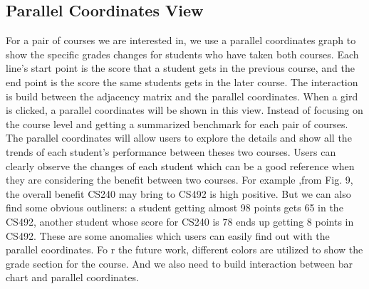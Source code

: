 \subsection{Parallel Coordinates View}
\label{sec:parallel}
For a pair of courses we are interested in,  we use a parallel coordinates graph to show the specific grades changes for students who have taken both courses. Each line’s start point is the score that a student gets in the previous course, and the end point is the score the same students gets in the later course. The interaction is build between the adjacency matrix and the parallel coordinates. When a gird is clicked, a parallel coordinates will be shown in this view. Instead of focusing on the course level and getting a summarized benchmark  for each pair of courses. The parallel coordinates will allow users to explore the details and show all the trends of each student’s performance between theses two courses. Users can clearly observe the changes of each student which can be  a good reference when they are considering the benefit between two courses. For example ,from Fig. 9, the overall benefit CS240 may bring to CS492 is high positive. But we can also find some obvious outliners: a student getting almost 98 points gets 65 in the CS492, another student whose score for CS240 is 78 ends up getting 8 points in CS492. These are some anomalies which users can easily find out with the parallel coordinates. Fo r the future work, different colors are utilized to show the grade section for the course. And we also need to build  interaction between bar chart and parallel coordinates.

